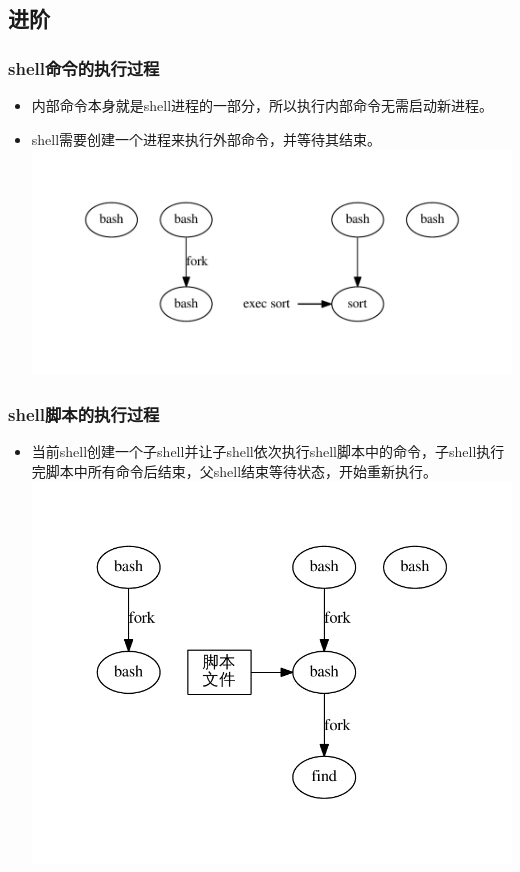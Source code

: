\documentclass[xcolor=svgnames,presentation]{beamer}
\begin{document}
\subsection{进阶}
\label{sec-1-3}
\begin{frame}
\frametitle{shell命令的执行过程}
\label{sec-1-3-1}
\begin{itemize}

\item 内部命令本身就是shell进程的一部分，所以执行内部命令无需启动新进程。
\label{sec-1-3-1-1}%

\item shell需要创建一个进程来执行外部命令，并等待其结束。\\
\label{sec-1-3-1-2}%
\includegraphics[width=.9\linewidth]{img/fork-exec.pdf}
\end{itemize} %
\end{frame}
\begin{frame}
\frametitle{shell脚本的执行过程}
\label{sec-1-3-2}
\begin{itemize}

\item 当前shell创建一个子shell并让子shell依次执行shell脚本中的命令，子shell执行完脚本中所有命令后结束，父shell结束等待状态，开始重新执行。\\
\label{sec-1-3-2-1}%
\includegraphics[width=.9\linewidth]{img/exec-shell.pdf}
\end{itemize} %
\end{frame}
\end{document}
